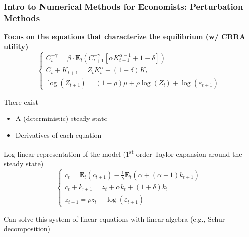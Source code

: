 \documentclass[10pt, aspectratio=1610]{beamer}
\newcommand{\E}{\mathbf{E}}
\begin{document}
  \begin{frame}
    \frametitle{Intro to Numerical Methods for Economists: Perturbation Methods}

    \textbf{Focus on the equations that characterize the equilibrium (w/ CRRA utility)}
    \begin{equation*}
      \begin{cases}
        C_t^{-\gamma} = \beta \cdot \E_t \left( C_{t+1}^{-\gamma} \left[ \alpha K_{t+1}^{\alpha-1} + 1 - \delta \right] \right) \\
        C_t + K_{t+1} = Z_t K_t^\alpha + (1 + \delta) K_t  \\
        \log(Z_{t+1}) = (1-\rho) \mu + \rho \log(Z_t) + \log(\varepsilon_{t+1})
      \end{cases}
    \end{equation*}

    \vfill\pause

    There exist
    \begin{itemize}
      \item A (deterministic) steady state
      \item Derivatives of each equation
    \end{itemize}

    \vfill\pause

    Log-linear representation of the model (1\textsuperscript{st} order Taylor expansion around the steady state)
    \begin{equation*}
      \begin{cases}
        c_t = \E_t ( c_{t+1} ) - \frac{1}{\gamma} \E_t \left( \alpha + (\alpha-1) k_{t+1} \right) \\
        c_t + k_{t+1} = z_t + \alpha k_t + (1+\delta) k_t \\
        z_{t+1} = \rho z_t + \log(\varepsilon_{t+1})
      \end{cases}
    \end{equation*}

    \vfill\pause

    Can solve this system of linear equations with linear algebra (e.g., Schur decomposition)

  \end{frame}
\end{document}
